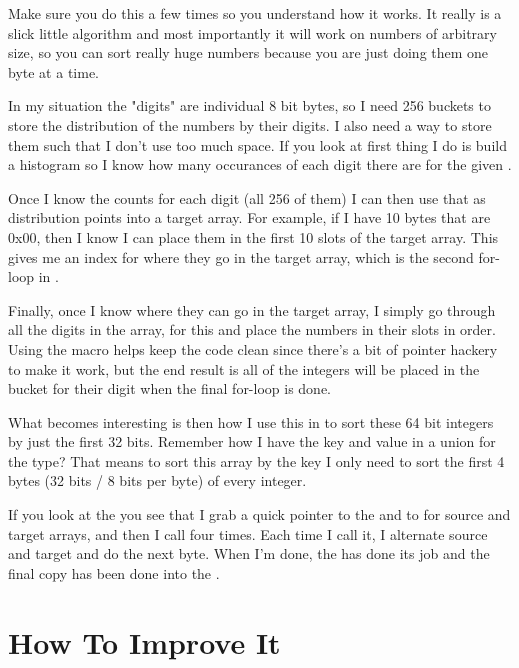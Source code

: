Make sure you do this a few times so you understand how it works.  It really is
a slick little algorithm and most importantly it will work on numbers of
arbitrary size, so you can sort really huge numbers because you are just doing
them one byte at a time.

In my situation the "digits" are individual 8 bit bytes, so I need 256 buckets
to store the distribution of the numbers by their digits.  I also need a way
to store them such that I don't use too much space.  If you look at
 first thing I do is build a  histogram so I
know how many occurances of each digit there are for the given .

Once I know the counts for each digit (all 256 of them) I can then use that
as distribution points into a target array.  For example, if I have 10 bytes
that are 0x00, then I know I can place them in the first 10 slots of the
target array.  This gives me an index for where they go in the target
array, which is the second for-loop in .

Finally, once I know where they can go in the target array, I simply go 
through all the digits in the  array, for this 
and place the numbers in their slots in order.  Using the 
macro helps keep the code clean since there's a bit of pointer hackery
to make it work, but the end result is all of the integers will be
placed in the bucket for their digit when the final for-loop is done.

What becomes interesting is then how I use this in 
to sort these 64 bit integers by just the first 32 bits.  Remember how
I have the key and value in a union for the  type?
That means to sort this array by the key I only need to sort the first
4 bytes (32 bits / 8 bits per byte) of every integer.

If you look at the  you see that I grab a quick
pointer to the  and  to for source and 
target arrays, and then I call  four times.  Each
time I call it, I alternate source and target and do the next byte.
When I'm done, the  has done its job and the final
copy has been done into the .

\section{How To Improve It}

